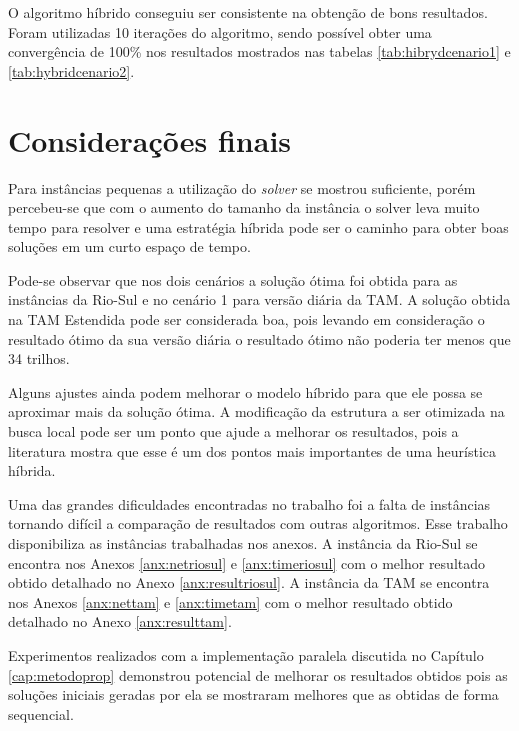 O algoritmo híbrido conseguiu ser consistente na obtenção de bons resultados.
Foram utilizadas 10 iterações do algoritmo, sendo possível obter uma
convergência de 100\% nos resultados mostrados nas tabelas \ref{tab:hibrydcenario1} e
\ref{tab:hybridcenario2}. 

\section{Considerações finais} \label{result:finalizacao}





Para instâncias pequenas a utilização do \textit{solver} se mostrou suficiente,
porém percebeu-se que com o aumento do tamanho da instância o solver leva muito
tempo para resolver e uma estratégia híbrida pode ser o caminho para obter boas
soluções em um curto espaço de tempo.

Pode-se observar que nos dois cenários a solução ótima foi obtida para as
instâncias da Rio-Sul e no cenário 1 para versão diária da TAM. A solução obtida
na TAM Estendida pode ser considerada boa, pois levando em consideração o resultado
ótimo da sua versão diária o resultado ótimo não poderia ter menos que 34
trilhos.
  
Alguns ajustes ainda podem melhorar o modelo híbrido para que ele possa se
aproximar mais da solução ótima. A modificação da estrutura a ser otimizada na
busca local pode ser um ponto que ajude a melhorar os resultados, pois a
literatura mostra que esse é um dos pontos mais importantes de uma heurística
híbrida.
 
Uma das grandes dificuldades encontradas no trabalho foi a falta de instâncias
tornando difícil a comparação de resultados com outras algoritmos. Esse trabalho
disponibiliza as instâncias trabalhadas nos anexos. A instância da Rio-Sul se
encontra nos Anexos \ref{anx:netriosul} e \ref{anx:timeriosul} com o melhor
resultado obtido detalhado no Anexo \ref{anx:resultriosul}. A instância da TAM
se encontra nos Anexos \ref{anx:nettam} e \ref{anx:timetam} com o melhor
resultado obtido detalhado no Anexo \ref{anx:resulttam}. 
 
Experimentos realizados com a implementação paralela discutida no Capítulo
\ref{cap:metodoprop} demonstrou potencial de melhorar os resultados obtidos pois
as soluções iniciais geradas por ela se mostraram melhores que as obtidas de
forma sequencial.
 

